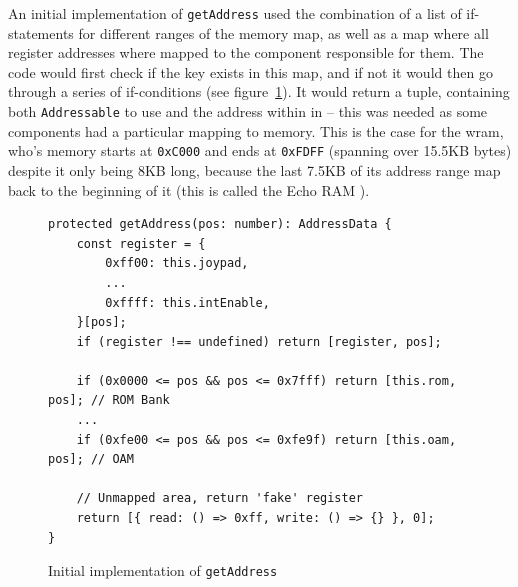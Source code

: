 \documentclass[11pt]{informatics-report}
\begin{document}
An initial implementation of \texttt{getAddress} used the combination of a list of if-statements for different ranges of the memory map, as well as a map where all register addresses where mapped to the component responsible for them. The code would first check if the key exists in this map, and if not it would then go through a series of if-conditions  (see figure~\ref{fig:getaddress-before}). It would return a tuple, containing both \texttt{Addressable} to use and the address within in -- this was needed as some components had a particular mapping to memory. This is the case for the \gls{wram}, who's memory starts at \texttt{0xC000} and ends at \texttt{0xFDFF} (spanning over 15.5KB bytes) despite it only being 8KB long, because the last 7.5KB of its address range map back to the beginning of it (this is called the Echo RAM \cite{memorymap}).

\begin{figure}[h]
    \begin{verbatim}
protected getAddress(pos: number): AddressData {
    const register = {
        0xff00: this.joypad,
        ...
        0xffff: this.intEnable,
    }[pos];
    if (register !== undefined) return [register, pos];

    if (0x0000 <= pos && pos <= 0x7fff) return [this.rom, pos]; // ROM Bank
    ...
    if (0xfe00 <= pos && pos <= 0xfe9f) return [this.oam, pos]; // OAM

    // Unmapped area, return 'fake' register
    return [{ read: () => 0xff, write: () => {} }, 0];
}
    \end{verbatim}
    \caption{Initial implementation of \texttt{getAddress}}
    \label{fig:getaddress-before}
\end{figure}
\end{document}
